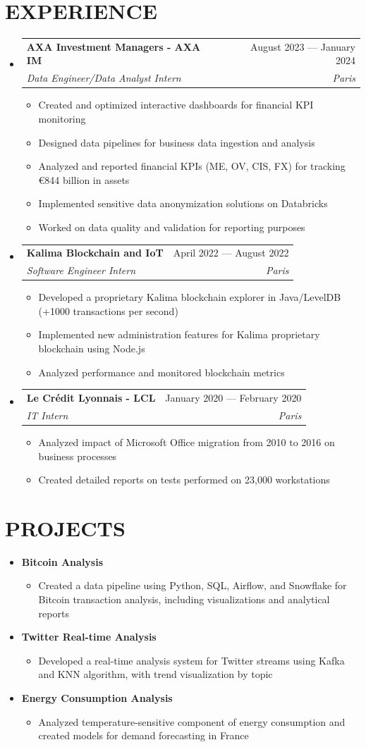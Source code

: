 \documentclass[11pt,a4paper]{article}
\makeatletter
\newcommand{\resumeItem}[1]{
  \item\footnotesize{
    {#1 \vspace{-1pt}}
  }
}
\newcommand{\resumeSubheading}[4]{
  \vspace{2pt}\item
    \begin{tabular*}{\textwidth}[t]{l@{\extracolsep{\fill}}r}
      {\footnotesize\textbf{#1}} & {\footnotesize#2} \\
      {\footnotesize\textit{#3}} & {\footnotesize\textit{#4}} \\
    \end{tabular*}\vspace{2pt}
}
\newcommand{\resumeProjectHeading}[2]{
  \item
  {\footnotesize#1} \hfill {#2}
}
\newcommand{\resumeSubHeadingListStart}{\begin{itemize}[leftmargin=0in, label={}]}
\newcommand{\resumeSubHeadingListEnd}{\end{itemize}}
\newcommand{\resumeItemListStart}{\begin{itemize}[label={\textbullet}]}
\newcommand{\resumeItemListEnd}{\end{itemize}\vspace{0pt}}
\makeatother
\begin{document}
\section{EXPERIENCE}
\resumeSubHeadingListStart
    \resumeSubheading
      {AXA Investment Managers - AXA IM}{August 2023 --- January 2024}
      {Data Engineer/Data Analyst Intern}{Paris}
      \resumeItemListStart
        \resumeItem{Created and optimized interactive dashboards for financial KPI monitoring}
        \resumeItem{Designed data pipelines for business data ingestion and analysis}
        \resumeItem{Analyzed and reported financial KPIs (ME, OV, CIS, FX) for tracking €844 billion in assets}
        \resumeItem{Implemented sensitive data anonymization solutions on Databricks}
        \resumeItem{Worked on data quality and validation for reporting purposes}
      \resumeItemListEnd
    \resumeSubheading
      {Kalima Blockchain and IoT}{April 2022 --- August 2022}
      {Software Engineer Intern}{Paris}
      \resumeItemListStart
        \resumeItem{Developed a proprietary Kalima blockchain explorer in Java/LevelDB (+1000 transactions per second)}
        \resumeItem{Implemented new administration features for Kalima proprietary blockchain using Node.js}
        \resumeItem{Analyzed performance and monitored blockchain metrics}
      \resumeItemListEnd
    \resumeSubheading
      {Le Crédit Lyonnais - LCL}{January 2020 --- February 2020}
      {IT Intern}{Paris}
      \resumeItemListStart
        \resumeItem{Analyzed impact of Microsoft Office migration from 2010 to 2016 on business processes}
        \resumeItem{Created detailed reports on tests performed on 23,000 workstations}
      \resumeItemListEnd
  \resumeSubHeadingListEnd

\section{PROJECTS}
\resumeSubHeadingListStart
    \resumeProjectHeading
      {\textbf{Bitcoin Analysis}} {}
      \resumeItemListStart
        \resumeItem{Created a data pipeline using Python, SQL, Airflow, and Snowflake for Bitcoin transaction analysis, including visualizations and analytical reports}
      \resumeItemListEnd
    \resumeProjectHeading
      {\textbf{Twitter Real-time Analysis}} {}
      \resumeItemListStart
        \resumeItem{Developed a real-time analysis system for Twitter streams using Kafka and KNN algorithm, with trend visualization by topic}
      \resumeItemListEnd
    \resumeProjectHeading
      {\textbf{Energy Consumption Analysis \@Capgemini}} {}
      \resumeItemListStart
        \resumeItem{Analyzed temperature-sensitive component of energy consumption and created models for demand forecasting in France}
      \resumeItemListEnd
\resumeSubHeadingListEnd
\end{document}
